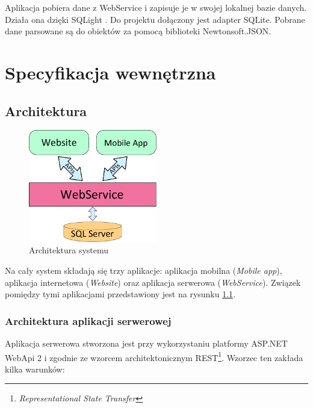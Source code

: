 \documentclass{book}
\begin{document}
		Aplikacja pobiera dane z WebService i zapisuje je w swojej lokalnej bazie danych. Działa ona dzięki SQLight \cite{id:SQLite}. Do projektu dołączony jest adapter SQLite. Pobrane dane parsowane są do obiektów za pomocą biblioteki Newtonsoft.JSON.




	\chapter{Specyfikacja wewnętrzna}
		\section{Architektura}
		
		\begin{figure}		
			\centering
			\includegraphics[width=0.5\textwidth]{images/architektura.pdf}
			\caption{Architektura systemu}
			\label{fig:architektura}
		\end{figure}
		
		Na cały system składają się trzy aplikacje: aplikacja mobilna (\emph{Mobile app}), aplikacja internetowa (\emph{Website}) oraz aplikacja serwerowa (\emph{WebService}). Związek pomiędzy tymi aplikacjami przedstawiony jest na rysunku \ref{fig:architektura}. 
			
			\subsection{Architektura aplikacji serwerowej}
			
			
			
			Aplikacja serwerowa stworzona jest przy wykorzystaniu platformy ASP.NET WebApi 2 i zgodnie ze wzorcem architektonicznym REST\footnote{\emph{Representational State Transfer}}. Wzorzec ten zakłada kilka warunków:
			
\end{document}
